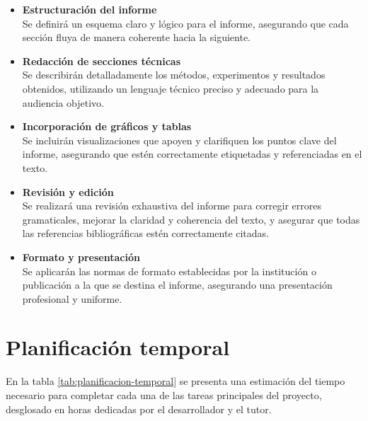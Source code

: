 \begin{itemize}
      \item \textbf{Estructuración del informe} \\
            Se definirá un esquema claro y lógico para el informe, asegurando que cada sección fluya de manera coherente hacia la siguiente.

      \item \textbf{Redacción de secciones técnicas} \\
            Se describirán detalladamente los métodos, experimentos y resultados obtenidos, utilizando un lenguaje técnico preciso y adecuado para la audiencia objetivo.

      \item \textbf{Incorporación de gráficos y tablas} \\
            Se incluirán visualizaciones que apoyen y clarifiquen los puntos clave del informe, asegurando que estén correctamente etiquetadas y referenciadas en el texto.

      \item \textbf{Revisión y edición} \\
            Se realizará una revisión exhaustiva del informe para corregir errores gramaticales, mejorar la claridad y coherencia del texto, y asegurar que todas las referencias bibliográficas estén correctamente citadas.

      \item \textbf{Formato y presentación} \\
            Se aplicarán las normas de formato establecidas por la institución o publicación a la que se destina el informe, asegurando una presentación profesional y uniforme.
\end{itemize}

\section{Planificación temporal}

En la tabla \ref{tab:planificacion-temporal} se presenta una estimación del tiempo necesario para completar cada una de las tareas principales del proyecto, desglosado en horas dedicadas por el desarrollador y el tutor.

